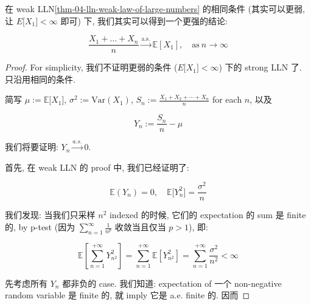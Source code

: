 \begin{theorem}{}

在 weak LLN\ref{thm-04-lln-weak-law-of-large-numbers} 的相同条件 (其实可以更弱, 让 \(\mathit{E}\lbrack\mathit{X}_{1}\rbrack < \infty\) 即可) 下, 我们其实可以得到一个更强的结论:

\[\frac{\mathit{X}_{1} + \ldots + \mathit{X}_{\mathit{n}}}{\mathit{n}}\overset{\text{a.s.}}{\rightarrow}\mathbb{E}\left\lbrack \mathit{X}_{1} \right\rbrack,\quad\text{as}\ \mathit{n}\rightarrow\infty\]

\end{theorem}

\begin{proof}

For simplicity, 我们不证明更弱的条件 (\(\mathit{E}\lbrack\mathit{X}_{1}\rbrack < \infty\)) 下的 strong LLN 了. 只沿用相同的条件.

简写 \(\mathit{\mu} := \mathbb{E}\lbrack\mathit{X}_{1}\rbrack\), \(\mathit{\sigma}^{2} := \text{Var}(\mathit{X}_{1})\), \(\mathit{S}_{\mathit{n}} := \frac{\mathit{X}_{1} + \mathit{X}_{2} + \cdots + \mathit{X}_{\mathit{n}}}{\mathit{n}}\) for each \(\mathit{n}\), 以及

\[\mathit{Y}_{\mathit{n}} := \frac{\mathit{S}_{\mathit{n}}}{\mathit{n}} - \mathit{\mu}\]

我们将要证明: \(\mathit{Y}_{\mathit{n}}\overset{\mathit{a}.\mathit{s}.}{\rightarrow}0\).

首先, 在 weak LLN 的 proof 中, 我们已经证明了:

\[\mathbb{E}(\mathit{Y}_{\mathit{n}}) = 0,\quad\mathbb{E}\lbrack\mathit{Y}_{\mathit{n}}^{2}\rbrack = \frac{\mathit{\sigma}^{2}}{\mathit{n}}\]

我们发现: 当我们只采样 \(\mathit{n}^{2}\) indexed 的时候, 它们的 expectation 的 sum 是 finite 的, by p-test (因为 \(\sum_{\mathit{n} = 1}^{\infty}\frac{1}{\mathit{n}^{\mathit{p}}}\) 收敛当且仅当 \(\mathit{p} > 1\)), 即:

\[\mathbb{E}\left\lbrack {\sum\limits_{\mathit{n} = 1}^{+ \infty}\mathit{Y}_{\mathit{n}^{2}}^{2}} \right\rbrack = \sum\limits_{\mathit{n} = 1}^{+ \infty}\mathbb{E}\left\lbrack \mathit{Y}_{\mathit{n}^{2}}^{2} \right\rbrack = \sum\limits_{\mathit{n} = 1}^{+ \infty}\frac{\mathit{\sigma}^{2}}{\mathit{n}^{2}} < \infty\]

先考虑所有 \(\mathit{Y}_{\mathit{n}}\) 都非负的 case. 我们知道: expectation of 一个 non-negative random variable 是 finite 的, 就 imply 它是 a.e. finite 的. 因而


\end{proof}
